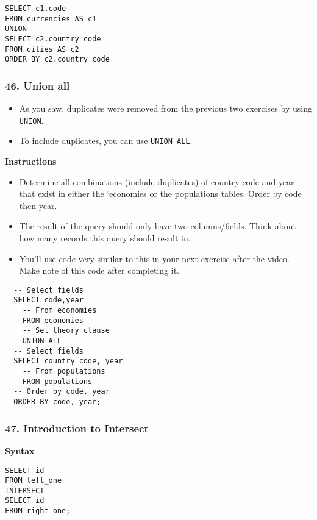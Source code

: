 \documentclass[
]{article}
\providecommand{\tightlist}{%
  \setlength{\itemsep}{0pt}\setlength{\parskip}{0pt}}
\begin{document}
\begin{verbatim}
SELECT c1.code
FROM currencies AS c1
UNION
SELECT c2.country_code
FROM cities AS c2
ORDER BY c2.country_code
\end{verbatim}

\hypertarget{union-all}{%
\subsubsection{46. Union all}\label{union-all}}

\begin{itemize}
\item
  As you saw, duplicates were removed from the previous two exercises by
  using \texttt{UNION}.
\item
  To include duplicates, you can use \texttt{UNION\ ALL}.
\end{itemize}

\textbf{Instructions}

\begin{itemize}
\tightlist
\item
  Determine all combinations (include duplicates) of country code and
  year that exist in either the `economies or the populations tables.
  Order by code then year.\\
\item
  The result of the query should only have two columns/fields. Think
  about how many records this query should result in.\\
\item
  You'll use code very similar to this in your next exercise after the
  video. Make note of this code after completing it.
\end{itemize}

\begin{verbatim}
  -- Select fields
  SELECT code,year
    -- From economies
    FROM economies
    -- Set theory clause
    UNION ALL
  -- Select fields
  SELECT country_code, year
    -- From populations
    FROM populations
  -- Order by code, year
  ORDER BY code, year;
\end{verbatim}

\hypertarget{introduction-to-intersect}{%
\subsubsection{47. Introduction to
Intersect}\label{introduction-to-intersect}}

\textbf{Syntax}

\begin{verbatim}
SELECT id
FROM left_one
INTERSECT
SELECT id
FROM right_one;
\end{verbatim}
\end{document}
